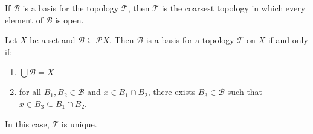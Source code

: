 \begin{cor}
  \label{cor:topology:basis:coarsest}
  If $\mathcal{B}$ is a basis for the topology $\mathcal{T}$, then
  $\mathcal{T}$ is the coarsest topology in which every element of
  $\mathcal{B}$ is open.
\end{cor}

\begin{lm}
  \label{lm:topology:basis:generate}
  Let $X$ be a set and $\mathcal{B} \subseteq \mathcal{P} X$. Then
  $\mathcal{B}$ is a basis for a topology $\mathcal{T}$ on $X$ if and only if:
  \begin{enumerate}
    \item
    $\bigcup \mathcal{B} = X$
    \item
    for all $B_1, B_2 \in \mathcal{B}$ and $x \in B_1 \cap B_2$, there exists
    $B_3
    \in \mathcal{B}$ such that $x \in B_3 \subseteq B_1 \cap B_2$.
  \end{enumerate}
  In this case, $\mathcal{T}$ is unique.
\end{lm}


